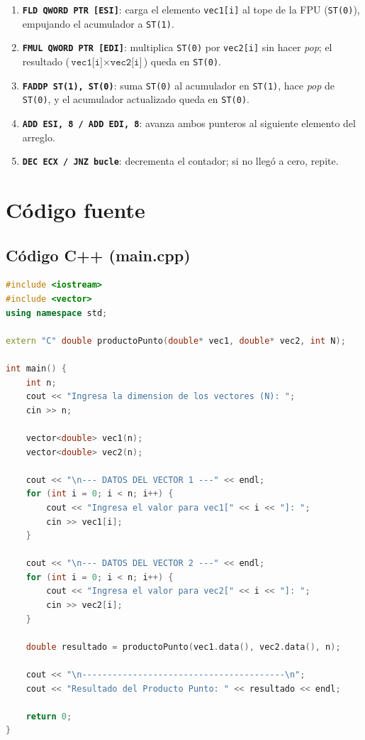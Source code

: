 \documentclass[12pt, letterpaper]{article}
\begin{document}
\begin{enumerate}
    \item \textbf{\texttt{FLD QWORD PTR [ESI]}}: carga el elemento \texttt{vec1[i]} al tope de la FPU (\texttt{ST(0)}), empujando el acumulador a \texttt{ST(1)}.
    \item \textbf{\texttt{FMUL QWORD PTR [EDI]}}: multiplica \texttt{ST(0)} por \texttt{vec2[i]} sin hacer \textit{pop}; el resultado ($\texttt{vec1[i]} \times \texttt{vec2[i]}$) queda en \texttt{ST(0)}.
    \item \textbf{\texttt{FADDP ST(1), ST(0)}}: suma \texttt{ST(0)} al acumulador en \texttt{ST(1)}, hace \textit{pop} de \texttt{ST(0)}, y el acumulador actualizado queda en \texttt{ST(0)}.
    \item \textbf{\texttt{ADD ESI, 8 / ADD EDI, 8}}: avanza ambos punteros al siguiente elemento del arreglo.
    \item \textbf{\texttt{DEC ECX / JNZ bucle}}: decrementa el contador; si no llegó a cero, repite.
\end{enumerate}

\section{Código fuente}

\subsection{Código C++ (main.cpp)}

\begin{lstlisting}[language=CPP, caption={\texttt{main.cpp} --- Programa en C++ que invoca la función ensamblador}]
#include <iostream>
#include <vector>
using namespace std;

extern "C" double productoPunto(double* vec1, double* vec2, int N);

int main() {
    int n;
    cout << "Ingresa la dimension de los vectores (N): ";
    cin >> n;

    vector<double> vec1(n);
    vector<double> vec2(n);

    cout << "\n--- DATOS DEL VECTOR 1 ---" << endl;
    for (int i = 0; i < n; i++) {
        cout << "Ingresa el valor para vec1[" << i << "]: ";
        cin >> vec1[i];
    }

    cout << "\n--- DATOS DEL VECTOR 2 ---" << endl;
    for (int i = 0; i < n; i++) {
        cout << "Ingresa el valor para vec2[" << i << "]: ";
        cin >> vec2[i];
    }

    double resultado = productoPunto(vec1.data(), vec2.data(), n);

    cout << "\n----------------------------------------\n";
    cout << "Resultado del Producto Punto: " << resultado << endl;

    return 0;
}
\end{lstlisting}
\end{document}
